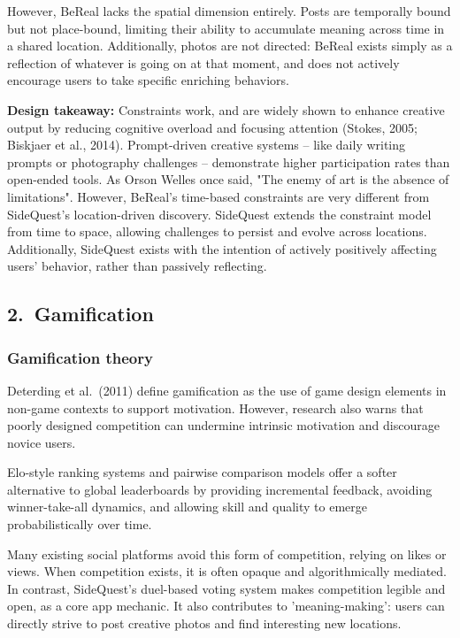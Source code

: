 \documentclass[12pt]{article}
\begin{document}
However, BeReal lacks the spatial dimension entirely. Posts are temporally bound but not place-bound, limiting their ability to accumulate meaning across time in a shared location. Additionally, photos are not directed: BeReal exists simply as a reflection of whatever is going on at that moment, and does not actively encourage users to take specific enriching behaviors.

\textbf{Design takeaway:} Constraints work, and are widely shown to enhance creative output by reducing cognitive overload and focusing attention (Stokes, 2005; Biskjaer et al., 2014). Prompt-driven creative systems -- like daily writing prompts or photography challenges -- demonstrate higher participation rates than open-ended tools. As Orson Welles once said, "The enemy of art is the absence of limitations".
However, BeReal's time-based constraints are very different from SideQuest's location-driven discovery. SideQuest extends the constraint model from time to space, allowing challenges to persist and evolve across locations. Additionally, SideQuest exists with the intention of actively positively affecting users' behavior, rather than passively reflecting.

\subsection*{2.\ Gamification}
\subsubsection*{Gamification theory}
Deterding et al.\ (2011) define gamification as the use of game design elements in non-game contexts to support motivation. However, research also warns that poorly designed competition can undermine intrinsic motivation and discourage novice users.

Elo-style ranking systems and pairwise comparison models offer a softer alternative to global leaderboards by providing incremental feedback, avoiding winner-take-all dynamics, and allowing skill and quality to emerge probabilistically over time.

Many existing social platforms avoid this form of competition, relying on likes or views. When competition exists, it is often opaque and algorithmically mediated. In contrast, SideQuest's duel-based voting system makes competition legible and open, as a core app mechanic. It also contributes to 'meaning-making': users can directly strive to post creative photos and find interesting new locations.
\end{document}

